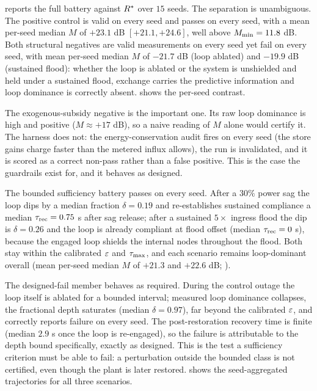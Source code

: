 \documentclass[11pt]{article}
\begin{document}
 reports the full battery against $R^*$ over $15$ seeds. The separation is unambiguous. The positive control is valid on every seed and passes \NC on every seed, with a mean per-seed median $M$ of $+23.1$ dB $[+21.1, +24.6]$, well above $M_{\min} = 11.8$ dB. Both structural negatives are valid measurements on every seed yet fail \NC on every seed, with mean per-seed median $M$ of $-21.7$ dB (loop ablated) and $-19.9$ dB (sustained flood): whether the loop is ablated or the system is unshielded and held under a sustained flood, exchange carries the predictive information and loop dominance is correctly absent.  shows the per-seed contrast.

The exogenous-subsidy negative is the important one. Its raw loop dominance is high and positive ($M \approx +17$ dB), so a naive reading of $M$ alone would certify it. The harness does not: the energy-conservation audit fires on every seed (the store gains charge faster than the metered influx allows), the run is invalidated, and it is scored as a correct non-pass rather than a false positive. This is the case the guardrails exist for, and it behaves as designed.

The bounded sufficiency battery passes on every seed. After a $30\%$ power sag the loop dips by a median fraction $\delta = 0.19$ and re-establishes sustained compliance a median $\tau_{\text{rec}} = 0.75$ s after sag release; after a sustained $5\times$ ingress flood the dip is $\delta = 0.26$ and the loop is already compliant at flood offset (median $\tau_{\text{rec}} = 0$ s), because the engaged loop shields the internal nodes throughout the flood. Both stay within the calibrated $\varepsilon$ and $\tau_{\max}$, and each scenario remains loop-dominant overall (mean per-seed median $M$ of $+21.3$ and $+22.6$ dB; ).

The designed-fail member behaves as required. During the control outage the loop itself is ablated for a bounded interval; measured loop dominance collapses, the fractional depth saturates (median $\delta = 0.97$), far beyond the calibrated $\varepsilon$, and \SC correctly reports failure on every seed. The post-restoration recovery time is finite (median $2.9$ s once the loop is re-engaged), so the failure is attributable to the depth bound specifically, exactly as designed. This is the test a sufficiency criterion must be able to fail: a perturbation outside the bounded class is not certified, even though the plant is later restored.  shows the seed-aggregated trajectories for all three \SC scenarios.
\end{document}
